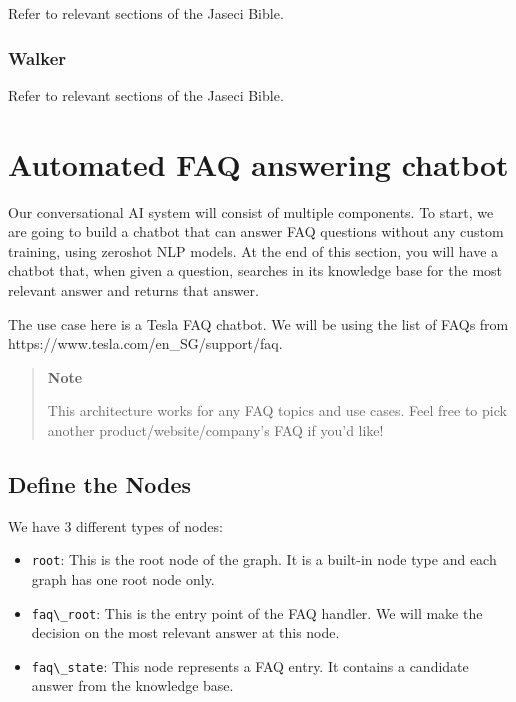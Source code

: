 Refer to relevant sections of the Jaseci Bible.

\hypertarget{walker}{%
\subsubsection{Walker}\label{walker}}

Refer to relevant sections of the Jaseci Bible.

\hypertarget{automated-faq-answering-chatbot}{%
\section{Automated FAQ answering
chatbot}\label{automated-faq-answering-chatbot}}

Our conversational AI system will consist of multiple components. To
start, we are going to build a chatbot that can answer FAQ questions
without any custom training, using zeroshot NLP models. At the end of
this section, you will have a chatbot that, when given a question,
searches in its knowledge base for the most relevant answer and returns
that answer.

The use case here is a Tesla FAQ chatbot. We will be using the list of
FAQs from https://www.tesla.com/en\_SG/support/faq.

\begin{quote}
\textbf{Note}

This architecture works for any FAQ topics and use cases. Feel free to
pick another product/website/company's FAQ if you'd like!
\end{quote}

\hypertarget{define-the-nodes}{%
\subsection{Define the Nodes}\label{define-the-nodes}}

We have 3 different types of nodes:

\begin{itemize}
\tightlist
\item
  \passthrough{\lstinline!root!}: This is the root node of the graph. It
  is a built-in node type and each graph has one root node only.
\item
  \passthrough{\lstinline!faq\_root!}: This is the entry point of the
  FAQ handler. We will make the decision on the most relevant answer at
  this node.
\item
  \passthrough{\lstinline!faq\_state!}: This node represents a FAQ
  entry. It contains a candidate answer from the knowledge base.
\end{itemize}

